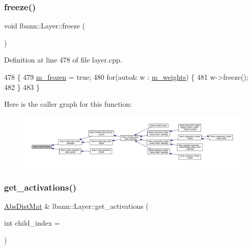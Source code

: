 \mbox{\label{classlbann_1_1Layer_ad55c455dbae0d082cedfa68511709aae}} 
\subsubsection{\texorpdfstring{freeze()}{freeze()}}
{\footnotesize\ttfamily void lbann\+::\+Layer\+::freeze (\begin{DoxyParamCaption}{ }\end{DoxyParamCaption})}



Definition at line 478 of file layer.\+cpp.


\begin{DoxyCode}
478                    \{
479   \hyperlink{classlbann_1_1Layer_afdc60df9731a3ecdeeeb8175fa483676}{m\_frozen} = \textcolor{keyword}{true};
480   \textcolor{keywordflow}{for}(\textcolor{keyword}{auto}& w : \hyperlink{classlbann_1_1Layer_a7954e30fbf9100a6ba4b56d02767a469}{m\_weights}) \{
481     w->freeze();
482   \}
483 \}
\end{DoxyCode}
Here is the caller graph for this function\+:\nopagebreak
\begin{figure}[H]
\begin{center}
\leavevmode
\includegraphics[width=350pt]{classlbann_1_1Layer_ad55c455dbae0d082cedfa68511709aae_icgraph}
\end{center}
\end{figure}
\mbox{\label{classlbann_1_1Layer_a1134b1a4385af199d7272c5aa827fa99}} 
\subsubsection{\texorpdfstring{get\+\_\+activations()}{get\_activations()}\hspace{0.1cm}{\footnotesize\ttfamily [1/2]}}
{\footnotesize\ttfamily \hyperlink{base_8hpp_a9a697a504ae84010e7439ffec862b470}{Abs\+Dist\+Mat} \& lbann\+::\+Layer\+::get\+\_\+activations (\begin{DoxyParamCaption}\item[{int}]{child\+\_\+index = {} }\end{DoxyParamCaption})}


